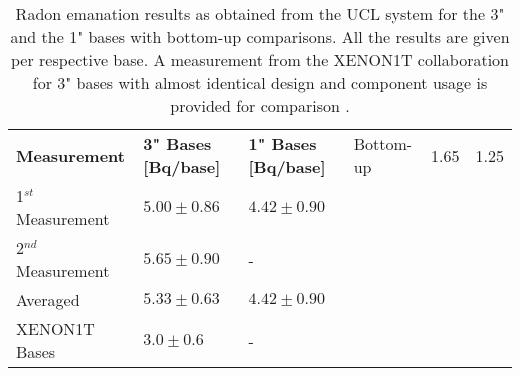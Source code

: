 \begin{table}[b]
\centering
\caption{Radon emanation results as obtained from the UCL system for the 3" and the 1" bases with bottom-up comparisons. All the results are given per respective base. A measurement from the XENON1T collaboration for 3" bases with almost identical design and component usage is provided for comparison \cite{Natascha}.}
\label{tab:pmt_base_results}
\vspace{1mm}
\renewcommand{\arraystretch}{1.2}
    \begin{tabularx}{.9\linewidth}{@{\extracolsep{\fill}}lll}
    \toprule
    
    \textbf{Measurement} & %
    \textbf{3" Bases [\micro{}Bq/base]} & %
    \textbf{1" Bases [\micro{}Bq/base]} & %
    
    \hline
    \hline
    
    Bottom-up 	        & 1.65              & 1.25          \\
    1$^{st}$ Measurement  & $5.00\pm0.86$     & $4.42\pm0.90$ \\       
    2$^{nd}$ Measurement	& $5.65\pm0.90$     & -             \\        
    \hline
    Averaged	        & $5.33\pm0.63$     & $4.42\pm0.90$ \\       
    XENON1T Bases       & $3.0\pm0.6$       & - \\
    
    \bottomrule
    \end{tabularx}
\end{table}

